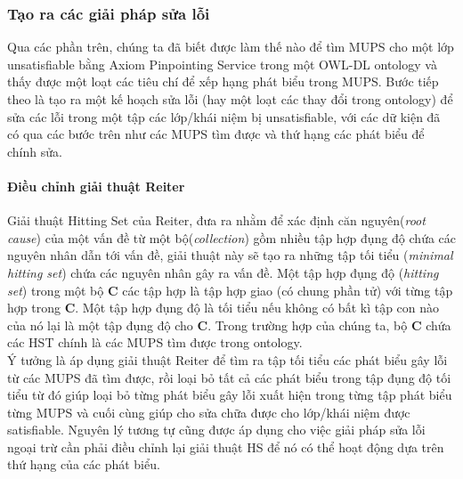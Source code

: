		\subsubsection{Tạo ra các giải pháp sửa lỗi}
		Qua các phần trên, chúng ta đã biết được làm thế nào để tìm MUPS cho một lớp unsatisfiable bằng Axiom Pinpointing Service trong một OWL-DL ontology và thấy được một loạt các tiêu chí để xếp hạng phát biểu trong MUPS. Bước tiếp theo là tạo ra một kế hoạch sửa lỗi (hay một loạt các thay đổi trong ontology) để sửa các lỗi trong một tập các lớp/khái niệm bị unsatisfiable, với các dữ kiện đã có qua các bước trên như các MUPS tìm được và thứ hạng các phát biểu để chính sửa.
		
		\paragraph{Điều chỉnh giải thuật Reiter} Giải thuật Hitting Set của Reiter\cite{hst}, đưa ra nhằm để xác định căn nguyên(\textit{root cause}) của một vấn đề từ một bộ(\textit{collection}) gồm nhiều tập hợp đụng độ chứa các nguyên nhân dẫn tới vấn đề, giải thuật này sẽ tạo ra những tập tối tiểu (\textit{minimal hitting set}) chứa các nguyên nhân gây ra vấn đề. Một tập hợp đụng độ (\textit{hitting set}) trong một bộ \textbf{C} các tập hợp là tập hợp giao (có chung phần tử) với từng tập hợp trong \textbf{C}. Một tập hợp đụng độ là tối tiểu nếu không có bất kì tập con nào của nó lại là một tập đụng độ cho \textbf{C}. Trong trường hợp của chúng ta, bộ \textbf{C} chứa các HST chính là các MUPS tìm được trong ontology.  \\\hspace*{.05\textwidth} Ý tưởng là áp dụng giải thuật Reiter để tìm ra tập tối tiểu các phát biểu gây lỗi từ các MUPS đã tìm được, rồi loại bỏ tất cả các phát biểu trong tập đụng độ tối tiểu từ đó giúp loại bỏ từng phát biểu gây lỗi xuất hiện trong từng tập phát biểu từng MUPS và cuối cùng giúp cho sửa chữa được cho lớp/khái niệm được satisfiable. Nguyên lý tương tự cũng được áp dụng cho việc giải pháp sửa lỗi ngoại trừ cần phải điều chỉnh lại giải thuật HS để nó có thể hoạt động dựa trên thứ hạng của các phát biểu.
		
